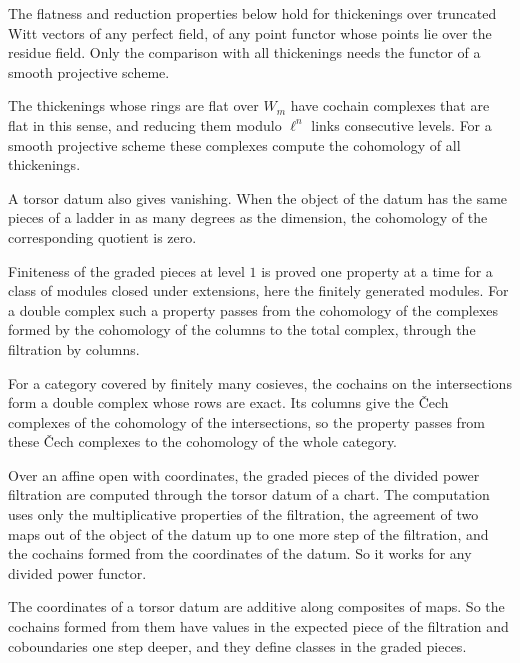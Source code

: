 The flatness and reduction properties below hold for thickenings over truncated Witt vectors of any perfect field, of
any point functor whose points lie over the residue field. Only the comparison with all thickenings needs the functor
of a smooth projective scheme.

The thickenings whose rings are flat over $W_m$ have cochain complexes that are flat in this sense, and reducing them
modulo $\ell^n$ links consecutive levels. For a smooth projective scheme these complexes compute the cohomology of all
thickenings.

A torsor datum also gives vanishing. When the object of the datum has the same pieces of a ladder in as many degrees as
the dimension, the cohomology of the corresponding quotient is zero.

Finiteness of the graded pieces at level $1$ is proved one property at a time for a class of modules closed under
extensions, here the finitely generated modules. For a double complex such a property passes from the cohomology of the
complexes formed by the cohomology of the columns to the total complex, through the filtration by columns.

For a category covered by finitely many cosieves, the cochains on the intersections form a double complex whose rows are
exact. Its columns give the \v{C}ech complexes of the cohomology of the intersections, so the property passes from these
\v{C}ech complexes to the cohomology of the whole category.

Over an affine open with coordinates, the graded pieces of the divided power filtration are computed through the torsor
datum of a chart. The computation uses only the multiplicative properties of the filtration, the agreement of two maps
out of the object of the datum up to one more step of the filtration, and the cochains formed from the coordinates of the
datum. So it works for any divided power functor.

The coordinates of a torsor datum are additive along composites of maps. So the cochains formed from them have values in
the expected piece of the filtration and coboundaries one step deeper, and they define classes in the graded pieces.

